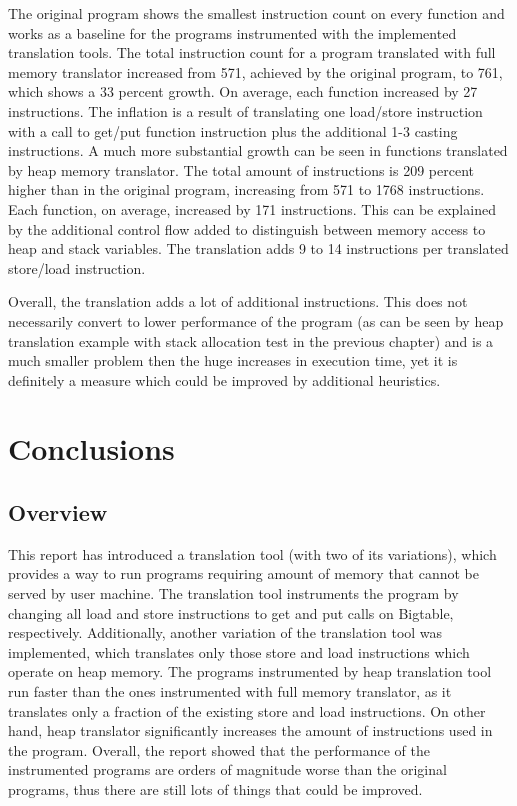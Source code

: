 \documentclass[bsc,frontabs,twoside,singlespacing,parskip,deptreport]{infthesis}     %
\begin{document}
The original program shows the smallest instruction count on every function and works as a baseline for the programs instrumented with the implemented translation tools. The total instruction count for a program translated with full memory translator increased from 571, achieved by the original program, to 761, which shows a 33 percent growth. On average, each function increased by 27 instructions. The inflation is a result of translating one load/store instruction with a call to get/put function instruction plus the additional 1-3 casting instructions. A much more substantial growth can be seen in functions translated by heap memory translator. The total amount of instructions is 209 percent higher than in the original program, increasing from 571 to 1768 instructions. Each function, on average, increased by 171 instructions. This can be explained by the additional control flow added to distinguish between memory access to heap and stack variables. The translation adds 9 to 14 instructions per translated store/load instruction.

Overall, the translation adds a lot of additional instructions. This does not necessarily convert to lower performance of the program (as can be seen by heap translation example with stack allocation test in the previous chapter) and is a much smaller problem then the huge increases in execution time, yet it is definitely a measure which could be improved by additional heuristics.

\chapter{Conclusions}

\section{Overview}

This report has introduced a translation tool (with two of its variations), which provides a way to run programs requiring amount of memory that cannot be served by user machine. The translation tool instruments the program by changing all load and store instructions to get and put calls on Bigtable, respectively. Additionally, another variation of the translation tool was implemented, which translates only those store and load instructions which operate on heap memory. The programs instrumented by heap translation tool run faster than the ones instrumented with full memory translator, as it translates only a fraction of the existing store and load instructions. On other hand, heap translator significantly increases the amount of instructions used in the program. Overall, the report showed that the performance of the instrumented programs are orders of magnitude worse than the original programs, thus there are still lots of things that could be improved.
\end{document}
